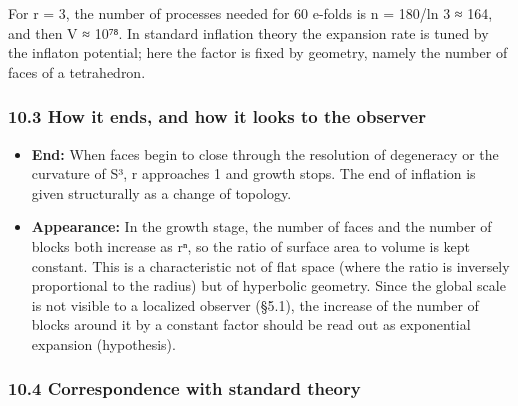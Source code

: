 \documentclass[
  a4paper,
]{article}
\providecommand{\tightlist}{%
  \setlength{\itemsep}{0pt}\setlength{\parskip}{0pt}}
\begin{document}
For r = 3, the number of processes needed for 60 e-folds is n = 180/ln 3
≈ 164, and then V ≈ 10⁷⁸. In standard inflation theory the expansion
rate is tuned by the inflaton potential; here the factor is fixed by
geometry, namely the number of faces of a tetrahedron.

\subsubsection{10.3 How it ends, and how it looks to the
observer}\label{how-it-ends-and-how-it-looks-to-the-observer}

\begin{itemize}
\tightlist
\item
  \textbf{End:} When faces begin to close through the resolution of
  degeneracy or the curvature of S³, r approaches 1 and growth stops.
  The end of inflation is given structurally as a change of topology.
\item
  \textbf{Appearance:} In the growth stage, the number of faces and the
  number of blocks both increase as rⁿ, so the ratio of surface area to
  volume is kept constant. This is a characteristic not of flat space
  (where the ratio is inversely proportional to the radius) but of
  hyperbolic geometry. Since the global scale is not visible to a
  localized observer (§5.1), the increase of the number of blocks around
  it by a constant factor should be read out as exponential expansion
  (hypothesis).
\end{itemize}

\subsubsection{10.4 Correspondence with standard
theory}\label{correspondence-with-standard-theory}
\end{document}
